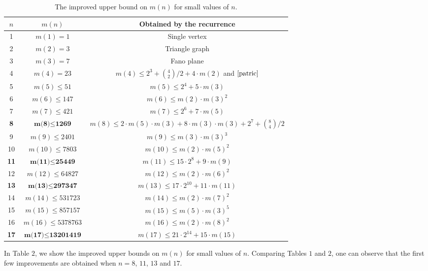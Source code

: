 \documentclass[11pt]{article}
\begin{document}
\begin{table}
\caption{The improved upper bound on $m(n)$ for small values of $n$.}
\begin{center}
\begin{tabular}{|c|c|c|}
\hline
$n$ & $m(n)$ & Obtained by the recurrence\\
\hline
1& $m(1) = 1$&Single vertex\\
2&$m(2) = 3$&Triangle graph\\
3&$m(3) = 7$&Fano plane \cite{klein}\\
4&$m(4) = 23$&$m(4) \leq 2^3 + {4 \choose 2} / {2} + 4 \cdot m(2)$ and $\cite{patric}$\\
5&$m(5) \leq 51$&$m(5) \leq 2^4 + 5 \cdot m(3)$\\
6&$m(6) \leq 147$&$m(6) \leq m(2) \cdot m(3)^2$\\
7&$m(7) \leq 421$&$m(7) \leq 2^6 + 7 \cdot m(5)$\\
\textbf{8}&$\textbf{m(8)} \leq \textbf{1269}$&$m(8) \leq 2 \cdot m(5) \cdot m(3) + 8 \cdot m(3) \cdot m(3) + 2^7 + {8 \choose 4} / {2} $\\
9&$m(9) \leq 2401$&$m(9) \leq m(3) \cdot m(3)^3$\\
10&$m(10) \leq 7803$&$m(10) \leq m(2) \cdot m(5)^2$\\
\textbf{11}&$\textbf{m(11)} \leq \textbf{25449}$&$m(11) \leq 15 \cdot 2^8 + 9 \cdot m(9)$\\
12&$m(12) \leq 64827$&$m(12) \leq m(2) \cdot m(6)^2$\\
\textbf{13}&$\textbf{m(13)} \leq \textbf{297347}$&$m(13) \leq 17 \cdot 2^{10} + 11 \cdot m(11)$ \\
14&$m(14) \leq 531723$&$m(14) \leq m(2) \cdot m(7)^2$\\
15&$m(15) \leq 857157$&$m(15) \leq m(5) \cdot m(3)^5$\\
16&$m(16) \leq 5378763$&$m(16) \leq m(2) \cdot m(8)^2$\\
\textbf{17}&$\textbf{m(17)} \leq \textbf{13201419}$&$m(17) \leq 21 \cdot 2^{14} + 15 \cdot m(15)$ \\

\hline
\end{tabular}
\end{center}
\end{table}



In Table $2$, we show the improved upper bounds on $m(n)$ for small values of $n$. Comparing Tables $1$ and $2$, one can observe that the first few improvements are obtained when $n = 8$, $11$, $13$ and $17$.
\end{document}
